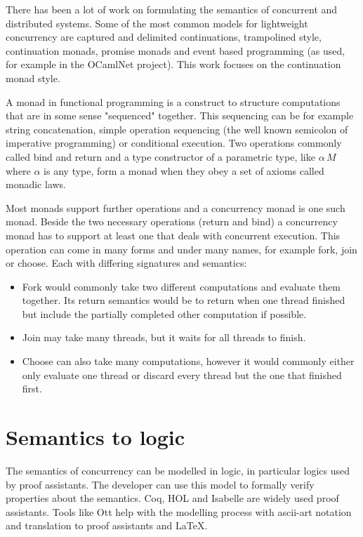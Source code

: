 \documentclass[12pt,twoside,notitlepage]{report}
\begin{document}
There has been a lot of work on formulating the semantics of concurrent and distributed systems. Some of the most common models for lightweight concurrency\cite{deleuzelight} are captured\cite{friedman1988applications} and delimited\cite{kiselyov2010delimited} continuations\cite{shan2004shift}, trampolined style\cite{ganz1999trampolined}, continuation monads\cite{Claessen99functionalpearls}, promise monads\cite{liskov1988promises} and event based programming (as used, for example in the OCamlNet\cite{Ocamlnet} project). This work focuses on the continuation monad style.

A monad\cite{hoareetal2001tackling} in functional programming is a construct to structure computations that are in some sense "sequenced" together. This sequencing can be for example string concatenation, simple operation sequencing (the well known semicolon of imperative programming) or conditional execution. Two operations commonly called bind and return and a type constructor of a parametric type, like $ \alpha \, M $ where $ \alpha $ is any type, form a monad when they obey a set of axioms called monadic laws.

Most monads support further operations and a concurrency monad is one such monad. Beside the two necessary operations (return and bind) a concurrency monad has to support at least one that deals with concurrent execution.  This operation can come in many forms and under many names, for example fork, join or choose. Each with differing signatures and semantics:
\begin{itemize}
\item{Fork would commonly take two different computations and evaluate them together. Its return semantics would be to return when one thread finished but include the partially completed other computation if possible.}
\item{Join may take many threads, but it waits for all threads to finish.}
\item{Choose can also take many computations, however it would commonly either only evaluate one thread or discard every thread but the one that finished first.}
\end{itemize}

\section{Semantics to logic}
The semantics of concurrency can be modelled in logic, in particular logics used by proof assistants. The developer can use this model to formally verify properties about the semantics\cite{benton2008mechanized,blazy2009mechanized,blazy2006formal,leroy2009formal}. Coq\cite{Coq}, HOL and Isabelle are widely used proof assistants. Tools like Ott\cite{Ott} help with the modelling process with ascii-art notation and translation to proof assistants and \LaTeX.
\end{document}
